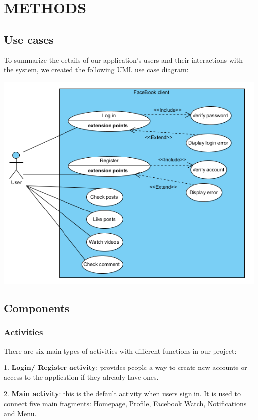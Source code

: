\newpage
\vspace{6cm}
\section{METHODS}
\subsection{Use cases}
\hspace{0.7cm}To summarize the details of our application’s users and their interactions with the system, we created the following UML use case diagram:

\vspace{1.5cm}
\includegraphics{Image/use_case.png}

\newpage
\subsection{Components}
\subsubsection{Activities}
\hspace{0.7cm}There are six main types of activities with different functions in our project:

\vspace{0.2cm} 1.	\textbf{Login/ Register activity}: provides people a way to create new accounts or access to the application if they already have ones.

\vspace{0.2cm}2.	\textbf{Main activity}: this is the default activity when users sign in. It is used to connect five main fragments: Homepage, Profile, Facebook Watch, Notifications and Menu.

